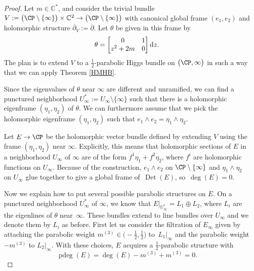 \begin{proof}
Let $m\in \mathbb{C}^*$, and consider the trivial bundle $V:=\bigl(\CP \setminus \{\infty\}\bigr)\times \mathbb{C}^2 \to \bigl(\CP \setminus \{\infty\}\bigr)$ with canonical global frame $(e_1,e_2)$ and holomorphic structure $\overline{\partial}_V:=\overline{\partial}$. Let $\theta$ be given in this frame by
\begin{equation*}
\theta= \begin{bmatrix}
 0& 1\\
 z^2+2m & 0\\
 \end{bmatrix}{\rm d}z.
\end{equation*}
The plan is to extend $V$ to a $\frac{1}{2}$-parabolic Higgs bundle on $\bigl(\CP,\infty\bigr)$ in such a way that we can apply Theorem \ref{HMHB}.

Since the eigenvalues of $\theta$ near $\infty$ are different and unramified, we can find a punctured neighborhood $U^*_{\infty}:=U_{\infty}\setminus \{\infty\}$ such that there is a holomorphic eigenframe $(\eta_1,\eta_2)$ of $\theta$. We can furthermore assume that we pick the holomorphic eigenframe $(\eta_1,\eta_2)$ such that $e_1\wedge e_2 = \eta_1\wedge \eta_2$.

Let $E\to \CP$ be the holomorphic vector bundle defined by extending $V$ using the frame $(\eta_1,\eta_2)$ near $\infty$. Explicitly, this means that holomorphic sections of $E$ in a neighborhood $U_{\infty}$ of $\infty$ are of the form $f^1\eta_1+f^2\eta_2$, where $f^i$ are holomorphic functions on $U_{\infty}$. Because of the construction, $e_1\wedge e_2$ on $\CP \setminus \{\infty\}$ and $\eta_1\wedge \eta_2$ on $U_{\infty}$ glue together to give a global frame of~$\operatorname{Det}(E)$, so~$\operatorname{deg}(E)=0$.

Now we explain how to put several possible parabolic structures on $E$. On a punctured neighborhood $U_{\infty}^*$ of $\infty$, we know that $E|_{U_{\infty}^*}=L_1\oplus L_2$, where $L_i$ are the eigenlines of $\theta$ near~$\infty$. These bundles extend to line bundles over $U_{\infty}$ and we denote them by $L_i$ as before. First let us consider the filtration of $E_{\infty}$ given by attaching the parabolic weight $m^{(3)} \in \bigl(-\frac12,\frac12\bigr)$ to~$L_1|_{\infty}$ and the parabolic weight $-m^{(3)}$ to $L_2|_{\infty}$. With these choices, $E$ acquires a $\frac{1}{2}$-parabolic structure with
\begin{equation*}
 \operatorname{pdeg}(E)=\operatorname{deg}(E)-m^{(3)}+m^{(3)}=0.
\end{equation*}


\end{proof}
